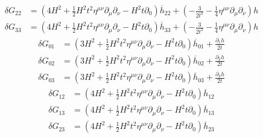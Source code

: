 \documentclass[10pt,letterpaper]{article}
\numberwithin{equation}{section}
\begin{document}
\begin{align}
	\delta G_{22} &=(4 H^2 + \tfrac{1}{2} H^2 t^2 \eta^{\mu \nu} \partial_{\mu} \partial_{\nu} -  H^2 t \partial_{0}) \overline{h}_{22} + (- \frac{3}{2 t^2} -  \tfrac{1}{4} \eta^{\mu \nu} \partial_{\mu} \partial_{\nu}) h
\end{align}
\begin{align}
	\delta G_{33} &=(4 H^2 + \tfrac{1}{2} H^2 t^2 \eta^{\mu \nu} \partial_{\mu} \partial_{\nu} -  H^2 t \partial_{0}) \overline{h}_{33} + (- \frac{3}{2 t^2} -  \tfrac{1}{4} \eta^{\mu \nu} \partial_{\mu} \partial_{\nu}) h
\end{align}
\begin{align}
	\delta G_{01} &=(3 H^2 + \tfrac{1}{2} H^2 t^2 \eta^{\mu \nu} \partial_{\mu} \partial_{\nu} -  H^2 t \partial_{0}) \overline{h}_{01} + \frac{\partial_{1} h}{2 t}
\end{align}
\begin{align}
	\delta G_{02} &=(3 H^2 + \tfrac{1}{2} H^2 t^2 \eta^{\mu \nu} \partial_{\mu} \partial_{\nu} -  H^2 t \partial_{0}) \overline{h}_{02} + \frac{\partial_{2} h}{2 t}
\end{align}
\begin{align}
	\delta G_{03} &= (3 H^2 + \tfrac{1}{2} H^2 t^2 \eta^{\mu \nu} \partial_{\mu} \partial_{\nu} -  H^2 t \partial_{0}) \overline{h}_{03} + \frac{\partial_{3} h}{2 t}
\end{align}
\begin{align}
	\delta G_{12} &=(4 H^2 + \tfrac{1}{2} H^2 t^2 \eta^{\mu \nu} \partial_{\mu} \partial_{\nu} -  H^2 t \partial_{0}) \overline{h}_{12}
\end{align}
\begin{align}
	\delta G_{13} &=(4 H^2 + \tfrac{1}{2} H^2 t^2 \eta^{\mu \nu} \partial_{\mu} \partial_{\nu} -  H^2 t \partial_{0}) \overline{h}_{13}
\end{align}
\begin{align}
	\delta G_{23} &=(4 H^2 + \tfrac{1}{2} H^2 t^2 \eta^{\mu \nu} \partial_{\mu} \partial_{\nu} -  H^2 t \partial_{0}) \overline{h}_{23}
\end{align}
\end{document}
